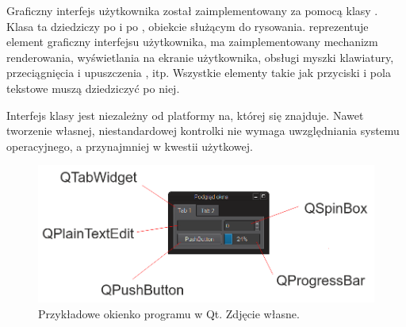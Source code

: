\par
Graficzny interfejs użytkownika został zaimplementowany za pomocą klasy .
Klasa ta dziedziczy po  i po , obiekcie służącym do rysowania.
 reprezentuje element graficzny interfejsu użytkownika, ma zaimplementowany mechanizm renderowania, wyświetlania na ekranie użytkownika, obsługi myszki klawiatury, przeciągnięcia i upuszczenia , itp.
Wszystkie elementy takie jak przyciski i pola tekstowe muszą dziedziczyć po niej.
\par
Interfejs klasy jest niezależny od platformy na, której się znajduje.
Nawet tworzenie własnej, niestandardowej kontrolki nie wymaga uwzględniania systemu operacyjnego, a przynajmniej w kwestii użytkowej.

\begin{figure}[!htbp]
    \centering
    \includegraphics[width=\textwidth]{img/qt-gui-001.png}
    \caption{Przykładowe okienko programu w Qt. Zdjęcie własne.}
    \label{fig:qtgui1}
\end{figure}

